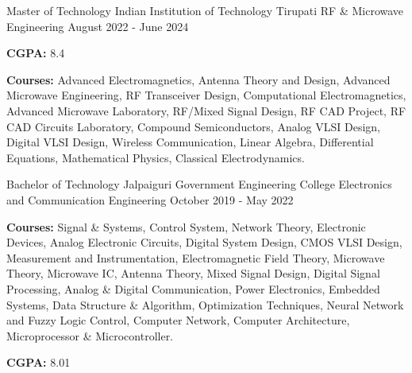 

\begin{cventries}

  \cventry
    {Master of Technology} %
    {Indian Institution of Technology Tirupati} %
    {RF \& Microwave Engineering } %
    {August 2022 - June 2024} %
    {
      \begin{cvitems} %
        \item {\textbf{CGPA:} 8.4}
        \item {\textbf{Courses:} Advanced Electromagnetics, Antenna Theory and Design, Advanced Microwave Engineering, RF Transceiver Design, Computational Electromagnetics, Advanced Microwave Laboratory, RF/Mixed Signal Design, RF CAD Project, RF CAD Circuits Laboratory, Compound Semiconductors, Analog VLSI Design, Digital VLSI Design, Wireless Communication, Linear Algebra, Differential Equations, Mathematical Physics, Classical Electrodynamics.}
      \end{cvitems}
    }
    
  \cventry
    {Bachelor of Technology} %
    {Jalpaiguri Government Engineering College} %
    {Electronics and Communication Engineering} %
    {October 2019 - May 2022} %
    {
      \begin{cvitems} %
        \item {\textbf{Courses:} Signal \& Systems, Control System, Network Theory, Electronic Devices, Analog Electronic Circuits, Digital System Design, CMOS VLSI Design, Measurement and Instrumentation, Electromagnetic Field Theory, Microwave Theory, Microwave IC, Antenna Theory, Mixed Signal Design, Digital Signal Processing, Analog \& Digital Communication, Power Electronics, Embedded Systems, Data Structure \& Algorithm, Optimization Techniques, Neural Network and Fuzzy Logic Control, Computer Network, Computer Architecture, Microprocessor \& Microcontroller.}
        \item {\textbf{CGPA:} 8.01}
      \end{cvitems}
    }


\end{cventries}
